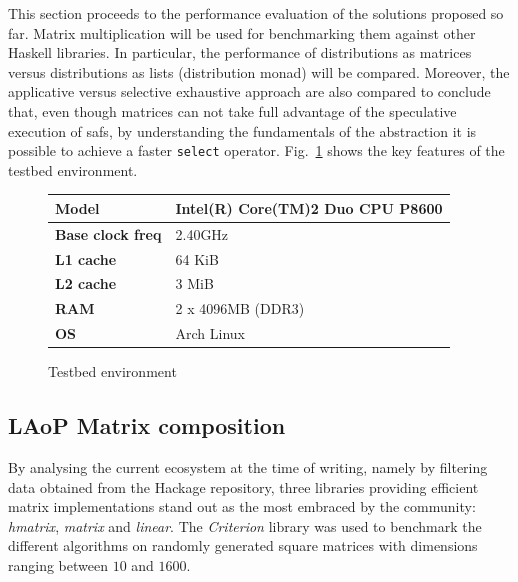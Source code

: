 \documentclass[
  oneside,
  11pt, a4paper,
  footinclude=true,
  headinclude=true,
  cleardoublepage=empty
]{scrbook}
\theoremstyle{definition}
\theoremstyle{definition}
\begin{document}
        This section proceeds to the performance evaluation of the solutions proposed so far. Matrix multiplication will be used for benchmarking  them against other Haskell libraries.
        In particular, the performance of distributions as matrices versus distributions as lists (distribution monad) will be compared. Moreover, the applicative versus selective exhaustive approach are also compared to conclude that, even though matrices can not take full advantage of the speculative execution of \glspl{saf}, by understanding the fundamentals of the abstraction it is possible to achieve a faster \texttt{select} operator. Fig.~\ref{tab:testbed} shows the key features of the testbed environment.
        \begin{figure}[H]%
        \centering\small
        \begin{tabular}{|l|l|}
        \hline
        \textbf{Model} & Intel(R) Core(TM)2 Duo CPU P8600 \\ \hline
        \textbf{Base clock freq} & 2.40GHz \\ \hline
        \textbf{L1 cache} & 64 KiB \\ \hline
        \textbf{L2 cache} & 3 MiB \\ \hline
        \textbf{RAM} & 2 x 4096MB (DDR3) \\ \hline
        \textbf{OS} & Arch Linux \\ \hline
        \end{tabular}
        \caption{Testbed environment \label{tab:testbed}}
        \end{figure}
        
        \subsection{LAoP Matrix composition}
        
    By analysing the current ecosystem at the time of writing, namely by filtering data obtained from the Hackage repository, three libraries providing efficient matrix implementations stand out as the most embraced by the community: \emph{hmatrix}, \emph{matrix} and \emph{linear}. The \emph{Criterion} library was used to benchmark the different algorithms on randomly generated square matrices with dimensions ranging between $10$ and $1600$.
    
\end{document}
